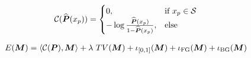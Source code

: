 \documentclass[pdftex,11pt,openright,headsepline]{book}
\begin{document}
\begin{align*}
\mathcal{C}(\widehat{\boldsymbol{P}}(x_{p})) =
\begin{cases}
  0, & \text{if}\ x_p \in \mathcal{S}  \\
  -\log \frac{\widehat{\boldsymbol{P}}(x_{p})}{1-\widehat{\boldsymbol{P}}(x_{p})}, & \text{else}
\end{cases}
\end{align*} 



\begin{align*}
\mathop{{}E}(\boldsymbol{M}) = \langle\mathcal{C}(\boldsymbol{P}), \boldsymbol{M}\rangle + \lambda\, \mathop{{}TV}(\boldsymbol{M}) + \iota_{[0,1]}(\boldsymbol{M}) + \iota_{\rm{FG}}(\boldsymbol{M})  + \iota_{\rm{BG}}(\boldsymbol{M}) 
\end{align*}
\end{document}
